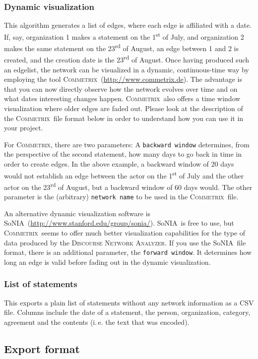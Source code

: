 \documentclass[12pt,a4paper]{scrreprt}
\newcommand{\dnalong}{\textsc{Discourse} \textsc{Network} \textsc{Analyzer}}
\newcommand{\commetrix}{\textsc{Commetrix}}
\newcommand{\sonia}{SoNIA}
\newcommand{\code}[1]{\texttt{#1}}
\begin{document}
\subsubsection{Dynamic visualization}
This algorithm generates a list of edges, where each edge is affiliated with a date. If, say, organization 1 makes a statement on the 1\textsuperscript{st} of July, and organization 2 makes the same statement on the 23\textsuperscript{rd} of August, an edge between 1 and 2 is created, and the creation date is the 23\textsuperscript{rd} of August. Once having produced such an edgelist, the network can be visualized in a dynamic, continuous-time way by employing the tool \commetrix\ (\url{http://www.commetrix.de}). The advantage is that you can now directly observe how the network evolves over time and on what dates interesting changes happen. \commetrix\ also offers a time window visualization where older edges are faded out. Please look at the description of the \commetrix\ file format below in order to understand how you can use it in your project. \par For \commetrix, there are two parameters: A \code{backward window} determines, from the perspective of the second statement, how many days to go back in time in order to create edges. In the above example, a backward window of 20 days would not establish an edge between the actor on the 1\textsuperscript{st} of July and the other actor on the 23\textsuperscript{rd} of August, but a backward window of 60 days would. The other parameter is the (arbitrary) \code{network name} to be used in the \commetrix\ file. \par An alternative dynamic visualization software is \sonia\ (\url{http://www.stanford.edu/group/sonia/}). \sonia\ is free to use, but \commetrix\ seems to offer much better visualization capabilities for the type of data produced by the \dnalong.  If you use the \sonia\ file format, there is an additional parameter, the \code{forward window}. It determines how long an edge is valid before fading out in the dynamic visualization.

\subsubsection{List of statements}
This exports a plain list of statements without any network information as a CSV file. Columns include the date of a statement, the person, organization, category, agreement and the contents (i.\,e. the text that was encoded).


\subsection{Export format}
\end{document}
